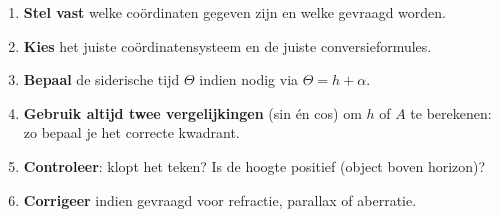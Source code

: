 \documentclass[11pt, a4paper]{article}
\begin{document}
\vspace{0.5cm}
\begin{tip}
\begin{enumerate}[leftmargin=1.5em, itemsep=3pt]
  \item \textbf{Stel vast} welke coördinaten gegeven zijn en welke gevraagd worden.
  \item \textbf{Kies} het juiste coördinatensysteem en de juiste conversieformules.
  \item \textbf{Bepaal} de siderische tijd $\Theta$ indien nodig via $\Theta = h + \alpha$.
  \item \textbf{Gebruik altijd twee vergelijkingen} (sin én cos) om $h$ of $A$ te berekenen: zo bepaal je het correcte kwadrant.
  \item \textbf{Controleer}: klopt het teken? Is de hoogte positief (object boven horizon)?
  \item \textbf{Corrigeer} indien gevraagd voor refractie, parallax of aberratie.
\end{enumerate}
\end{tip}
\end{document}
